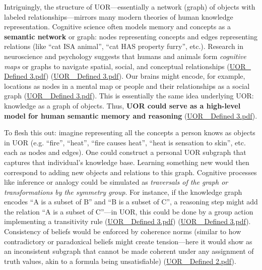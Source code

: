 \documentclass[12pt]{article}
\begin{document}
Intriguingly, the structure of UOR---essentially a network (graph) of objects with labeled relationships---mirrors many modern theories of human knowledge representation. Cognitive science often models memory and concepts as a \textbf{semantic network} or graph: nodes representing concepts and edges representing relations (like ``cat ISA animal'', ``cat HAS property furry'', etc.). Research in neuroscience and psychology suggests that humans and animals form \emph{cognitive maps} or graphs to navigate spatial, social, and conceptual relationships (\href{file://file-3oEyMHjK5WgHWfYmLyzhts#:~:text=%E2%97%8F%20Cognitive%20Science%20and%20Psychology%3A,a%20graph%20of%20locations%2C%20or}{UOR\_ Defined 3.pdf}) (\href{file://file-3oEyMHjK5WgHWfYmLyzhts#:~:text=associations%20,way%20that%20mirrors%20human%20cognitive}{UOR\_ Defined 3.pdf}). Our brains might encode, for example, locations as nodes in a mental map or people and their relationships as a social graph (\href{file://file-3oEyMHjK5WgHWfYmLyzhts#:~:text=%29,true%2C%20UOR%20could%20be%20an}{UOR\_ Defined 3.pdf}). This is essentially the same idea underlying UOR: knowledge as a graph of objects. Thus, \textbf{UOR could serve as a high-level model for human semantic memory and reasoning} (\href{file://file-3oEyMHjK5WgHWfYmLyzhts#:~:text=%29,way%20that%20mirrors%20human%20cognitive}{UOR\_ Defined 3.pdf}).

\medskip

To flesh this out: imagine representing all the concepts a person knows as objects in UOR (e.g. ``fire'', ``heat'', ``fire causes heat'', ``heat is sensation to skin'', etc. each as nodes and edges). One could construct a personal UOR subgraph that captures that individual’s knowledge base. Learning something new would then correspond to adding new objects and relations to this graph. Cognitive processes like inference or analogy could be simulated as \emph{traversals of the graph or transformations by the symmetry group}. For instance, if the knowledge graph encodes ``A is a subset of B'' and ``B is a subset of C'', a reasoning step might add the relation ``A is a subset of C''---in UOR, this could be done by a group action implementing a transitivity rule (\href{file://file-3oEyMHjK5WgHWfYmLyzhts#:~:text=one%20format%2C%20UOR%20makes%20it,An%20AI}{UOR\_ Defined 3.pdf}) (\href{file://file-3oEyMHjK5WgHWfYmLyzhts#:~:text=system%20could%20traverse%20the%20UOR,virtue%20of%20their%20connected%20structure}{UOR\_ Defined 3.pdf}). Consistency of beliefs would be enforced by coherence norms (similar to how contradictory or paradoxical beliefs might create tension---here it would show as an inconsistent subgraph that cannot be made coherent under any assignment of truth values, akin to a formula being unsatisfiable) (\href{file://file-TBF3nHDaRR5QeVMmwCFYkp#:~:text=algebraic%20embeddings,or%20topological%20properties%20of%20the}{UOR\_ Defined 2.pdf}).
\end{document}
